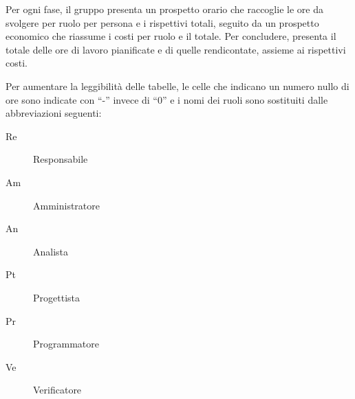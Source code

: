\documentclass[../piano-di-progetto.tex]{subfiles}
\begin{document}
Per ogni fase, il gruppo presenta un prospetto orario che raccoglie le ore da svolgere per ruolo per persona e i rispettivi totali, seguito da un prospetto economico che riassume i costi per ruolo e il totale. Per concludere, presenta il totale delle ore di lavoro pianificate e di quelle rendicontate, assieme ai rispettivi costi.

Per aumentare la leggibilità delle tabelle, le celle che indicano un numero nullo di ore sono indicate con ``-'' invece di ``0'' e i nomi dei ruoli sono sostituiti dalle abbreviazioni seguenti:
\begin{description}
  \item[Re] Responsabile
  \item[Am] Amministratore
  \item[An] Analista
  \item[Pt] Progettista
  \item[Pr] Programmatore
  \item[Ve] Verificatore
\end{description}
\end{document}
